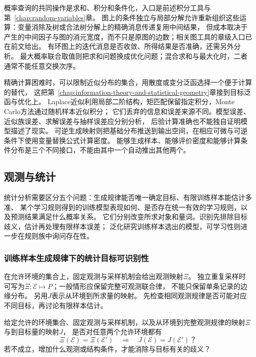 概率查询的共同操作是求和、积分和条件化，入口是前述积分工具与第~\ref{chap:random-variables}章。
图上的条件独立与局部分解允许重新组织这些运算：变量消除及树或合法树分解上的精确消息传递复用中间结果，
但成本取决于产生的中间因子与图的消元宽度，而不只是原图的边数；相关图工具的章级入口已在前文给出。
有环图上的迭代消息是否收敛、所得结果是否准确，还需另外分析。
最大概率联合取值则把求和问题换成优化问题；混合求和与最大化时，二者通常不能任意交换次序。

精确计算困难时，可以限制近似分布的集合，用散度或变分泛函选择一个便于计算的替代，
这把第~\ref{chap:information-theory-and-statistical-geometry}章接到目标泛函与优化上。
Laplace近似利用局部二阶结构，矩匹配保留指定积分，Monte Carlo方法通过随机样本近似积分；
它们丢弃的信息和误差来源不同。模型误差、近似族误差、求解误差与抽样误差应分别分析，
后验计算准确也不能独自证明模型描述了现实。
可逆生成映射则把基础分布推送到输出空间，在相应可微与可逆条件下使用变量替换公式计算密度。
能够生成样本、能够评价密度和能够计算条件分布是三个不同接口，不能由其中一个自动推出其他两个。

\subsection{观测与统计}
\label{sec:future-data-law-object-map}
\label{sec:future-information-proxy-map}
\label{sec:future-generalization-learnability-map}
\label{sec:future-reliability-map}
\label{sec:future-fairness-alignment-interpretation-map}

统计分析需要区分五个问题：生成规律能否唯一确定目标、有限训练样本能估计多准、
某个学习规则得到的训练模型表现如何、是否存在统一有效的学习规则，以及预测结果满足什么概率关系。
它们分别改变所求对象和量词。识别先排除目标歧义，估计再处理有限样本误差；
泛化研究训练样本选出的模型，可学习性则进一步在规则族中询问存在性。

\subsubsection{训练样本生成规律下的统计目标可识别性}
\label{sec:future-analysis-identification}

在允许环境的集合上，固定观测与采样机制会给出观测映射$\Xi$。
独立重复采样时可写为$\Xi:\mathcal E\mapsto P$；一般情形应保留完整可观测联合律，
不能只保留单条记录的边缘分布。
另用$J$表示从环境到所求量的映射。
先检查相同观测规律是否可能对应不同目标，再讨论有限样本估计。

\begin{mathproblem}[可观测规律是否确定所求量]
  \label{question:future-identification}
  给定允许的环境集合、固定观测与采样机制，以及从环境到完整观测规律的映射$\Xi$
  与到目标量的映射$J$，
  是否对任意两个允许环境都有
  \[
    \Xi(\mathcal E)=\Xi(\mathcal E')
    \quad\Longrightarrow\quad
    J(\mathcal E)=J(\mathcal E')\text{？}
  \]
  若不成立，增加什么观测或结构条件，才能消除与目标有关的歧义？
\end{mathproblem}

